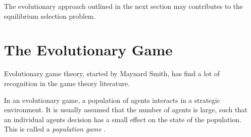 \documentclass[11pt]{article}
\begin{document}
The evolutionary approach outlined in the next section may contributes to 
the equilibrium selection problem. 

\section{The Evolutionary Game}
\label{evolutionarysection}
Evolutionary game theory, started by Maynard Smith, has find a lot of 
recognition in the game theory literature. 

In an evolutionary game, a population of agents interacts in a 
strategic environment. It is usually assumed that the number of agents is 
large, such that an individual agents decision has a small effect on the
state of the population. This is called a \textit{population game} \cite{sandholm_population_2010}.
\end{document}
